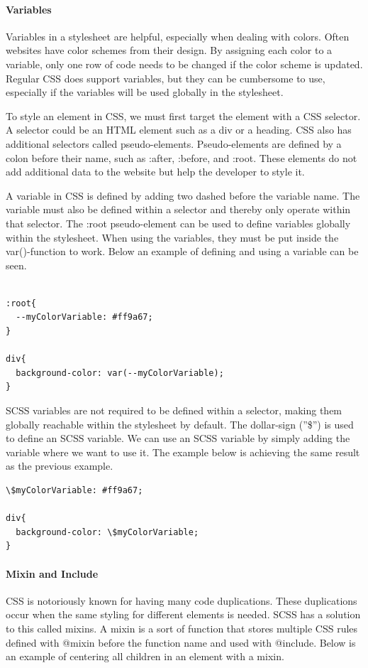 \paragraph{Variables}
Variables in a stylesheet are helpful, especially when dealing with colors. Often websites have color schemes from their design. By assigning each color to a variable, only one row of code needs to be changed if the color scheme is updated. Regular CSS does support variables, but they can be cumbersome to use, especially if the variables will be used globally in the stylesheet.

To style an element in CSS, we must first target the element with a CSS selector. A selector could be an HTML element such as a div or a heading. CSS also has additional selectors called pseudo-elements. Pseudo-elements are defined by a colon before their name, such as :after, :before, and :root. These elements do not add additional data to the website but help the developer to style it. 

A variable in CSS is defined by adding two dashed before the variable name.  The variable must also be defined within a selector and thereby only operate within that selector. The :root pseudo-element can be used to define variables globally within the stylesheet. When using the variables, they must be put inside the var()-function to work.
Below an example of defining and using a variable can be seen. 

\begin{lstlisting}[style=htmlcssjs]

:root{
  --myColorVariable: #ff9a67; 
}

div{
  background-color: var(--myColorVariable);
}
\end{lstlisting}


SCSS variables are not required to be defined within a selector, making them globally reachable within the stylesheet by default. The dollar-sign (''\$'') is used to define an SCSS variable. We can use an SCSS variable by simply adding the variable where we want to use it. The example below is achieving the same result as the previous example.


\begin{lstlisting}[style=htmlcssjs]
\$myColorVariable: #ff9a67; 

div{
  background-color: \$myColorVariable;
}
\end{lstlisting}


\paragraph{Mixin and Include}
CSS is notoriously known for having many code duplications. These duplications occur when the same styling for different elements is needed. SCSS has a solution to this called mixins. A mixin is a sort of function that stores multiple CSS rules defined with @mixin before the function name and used with @include. Below is an example of centering all children in an element with a mixin. 


